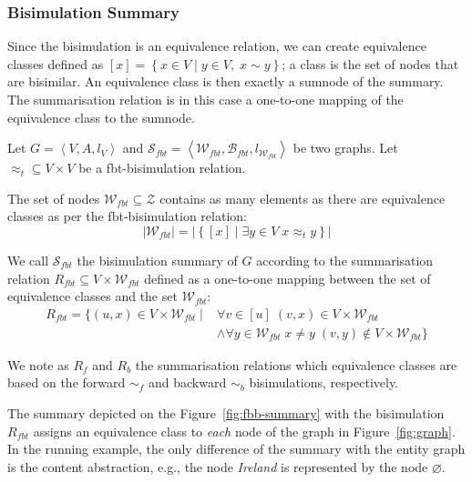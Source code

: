 \subsubsection{Bisimulation Summary}
\label{sec:bisim-summary}

Since the bisimulation is an equivalence relation, we can create equivalence classes defined as $[x] = \left\lbrace x \in V \mid y \in V,\; x \sim y \right\rbrace$; a class is the set of nodes that are bisimilar. An equivalence class is then exactly a sumnode of the summary. The summarisation relation is in this case a one-to-one mapping of the equivalence class to the sumnode.

\begin{definition}
Let $G=\left\langle V, A, l_V \right\rangle$ and $\mathcal{S}_{fbt} = \left\langle \mathcal{W}_{fbt}, \mathcal{B}_{fbt}, l_{\mathcal{W}_{fbt}} \right\rangle$ be two graphs. Let $\approx_t \subseteq V \times V$ be a fbt-bisimulation relation.

The set of nodes $\mathcal{W}_{fbt} \subseteq \mathcal{Z}$ contains as many elements as there are equivalence classes as per the fbt-bisimulation relation:
$$
\lvert \mathcal{W}_{fbt} \rvert = \lvert \left\lbrace [x] \mid \exists y \in V\; x \approx_t y \right\rbrace \rvert
$$

We call $\mathcal{S}_{fbt}$ the bisimulation summary of $G$ according to the summarisation relation $R_{fbt} \subseteq V \times \mathcal{W}_{fbt}$ defined as a one-to-one mapping between the set of equivalence classes and the set $\mathcal{W}_{fbt}$:
$$
\begin{aligned}
R_{fbt} = \{ \left( u, x \right) \in V \times \mathcal{W}_{fbt} \mid & \forall v \in [u]\; \left( v, x \right) \in V \times \mathcal{W}_{fbt} \\
& \wedge \forall y \in \mathcal{W}_{fbt}\; x \neq y\; (v, y) \not \in V \times \mathcal{W}_{fbt} \}
\end{aligned}
$$
\end{definition}

\begin{remark}
We note as $R_f$ and $R_b$ the summarisation relations which equivalence classes are based on the forward $\sim_f$ and backward $\sim_b$ bisimulations, respectively.
\end{remark}

The summary depicted on the Figure~\ref{fig:fbb-summary} with the bisimulation $R_{fbt}$ assigns an equivalence class to \emph{each} node of the graph in Figure~\ref{fig:graph}. In the running example, the only difference of the summary with the entity graph is the content abstraction, e.g., the node \emph{Ireland} is represented by the node $\varnothing$.


